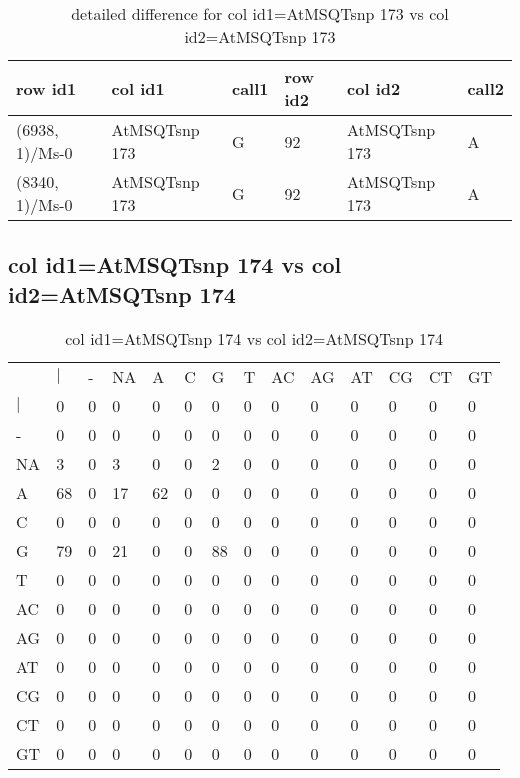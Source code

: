 \begin{center}
\begin{longtable}{|l|l|l|l|l|l|}
\caption{detailed difference for col id1=AtMSQTsnp 173 vs col id2=AtMSQTsnp 173} \label{table_dm747}\\
\hline
row id1&col id1&call1&row id2&col id2&call2\\
\hline
(6938, 1)/Ms-0&AtMSQTsnp 173&G&92&AtMSQTsnp 173&A\\
(8340, 1)/Ms-0&AtMSQTsnp 173&G&92&AtMSQTsnp 173&A\\
\hline
\end{longtable}
\end{center}

\subsection{col id1=AtMSQTsnp 174 vs col id2=AtMSQTsnp 174}
\begin{center}
\begin{longtable}{|l|l|l|l|l|l|l|l|l|l|l|l|l|l|}
\caption{col id1=AtMSQTsnp 174 vs col id2=AtMSQTsnp 174} \label{table_dm748}\\
\hline
\\
\hline
&$|$&-&NA&A&C&G&T&AC&AG&AT&CG&CT&GT\\
$|$&0&0&0&0&0&0&0&0&0&0&0&0&0\\
-&0&0&0&0&0&0&0&0&0&0&0&0&0\\
NA&3&0&3&0&0&2&0&0&0&0&0&0&0\\
A&68&0&17&62&0&0&0&0&0&0&0&0&0\\
C&0&0&0&0&0&0&0&0&0&0&0&0&0\\
G&79&0&21&0&0&88&0&0&0&0&0&0&0\\
T&0&0&0&0&0&0&0&0&0&0&0&0&0\\
AC&0&0&0&0&0&0&0&0&0&0&0&0&0\\
AG&0&0&0&0&0&0&0&0&0&0&0&0&0\\
AT&0&0&0&0&0&0&0&0&0&0&0&0&0\\
CG&0&0&0&0&0&0&0&0&0&0&0&0&0\\
CT&0&0&0&0&0&0&0&0&0&0&0&0&0\\
GT&0&0&0&0&0&0&0&0&0&0&0&0&0\\
\hline
\end{longtable}
\end{center}

